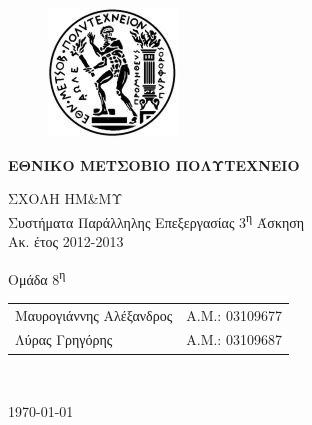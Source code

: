 \begin{titlepage}
\begin{center}
\begin{figure}[t] 
     \includegraphics[scale=0.7]{title/ntua_logo}
\end{figure}
\begin{LARGE}\textbf{ΕΘΝΙΚΟ ΜΕΤΣΟΒΙΟ ΠΟΛΥΤΕΧΝΕΙΟ\\}\end{LARGE}
\vspace{2cm}
\begin{Large}
ΣΧΟΛΗ ΗΜ\&ΜΥ\\
Συστήματα Παράλληλης Επεξεργασίας
3\textsuperscript{η} Άσκηση\\
Ακ. έτος 2012-2013\\
\end{Large}
\vspace{5cm}
\Large Ομάδα 8\textsuperscript{η}\\
\vspace{1cm}
\begin{tabular}{l r}
\Large{Μαυρογιάννης Αλέξανδρος}&
\large{Α.Μ.: 03109677}\\
\Large{Λύρας Γρηγόρης}&
\large{Α.Μ.: 03109687}\\
\end{tabular}\\
\vspace{5cm}

\vfill
\large\today\\
\end{center}
\end{titlepage}

